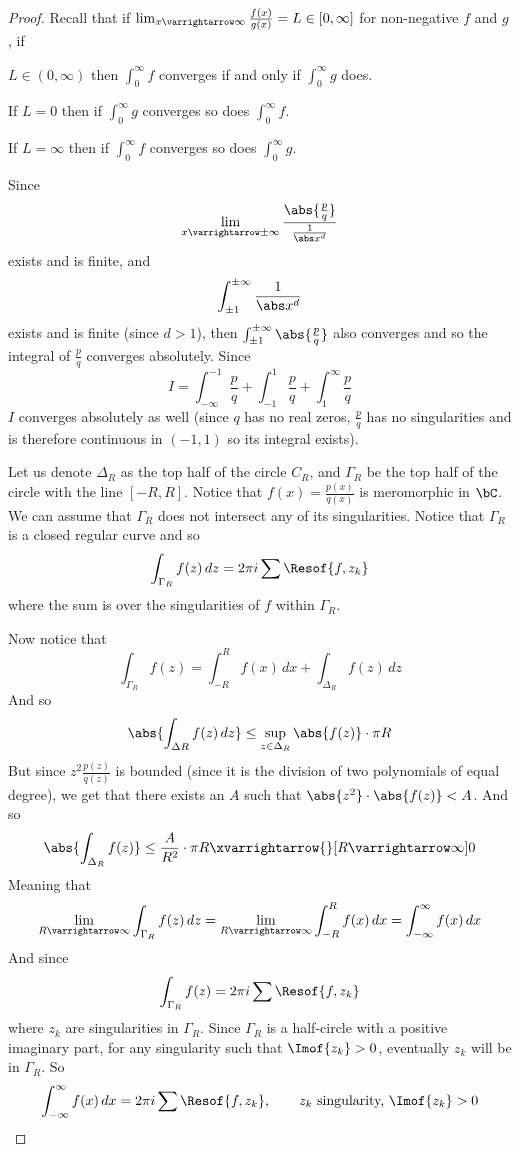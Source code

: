 \documentclass[10pt]{article}
\let\to=\varrightarrow
\begin{document}
\begin{proof}

    Recall that if $\lim_{x\to\infty}\frac{f(x)}{g(x)}=L\in[0,\infty]$ for non-negative $f$ and $g$, if
    \benum
        \item $L\in(0,\infty)$ then $\int_0^\infty f$ converges if and only if $\int_0^\infty g$ does.
        \item If $L=0$ then if $\int_0^\infty g$ converges so does $\int_0^\infty f$.
        \item If $L=\infty$ then if $\int_0^\infty f$ converges so does $\int_0^\infty g$.
    \eenum

    Since
    \[ \lim_{x\to\pm\infty}\frac{\abs{\frac pq}}{\frac1{\abs x^d}} \]
    exists and is finite, and
    \[ \int_{\pm1}^{\pm\infty}\frac1{\abs x^d} \]
    exists and is finite (since $d>1$), then $\int_{\pm1}^{\pm\infty}\abs{\frac pq}$ also converges and so the integral of $\frac pq$ converges absolutely.
    Since
    \[ I = \int_{-\infty}^{-1} \frac pq + \int_{-1}^1 \frac pq + \int_1^\infty \frac pq \]
    $I$ converges absolutely as well (since $q$ has no real zeros, $\frac pq$ has no singularities and is therefore continuous in $(-1,1)$ so its integral exists).

    Let us denote $\Delta_R$ as the top half of the circle $C_R$, and $\Gamma_R$ be the top half of the circle with the line $[-R,R]$.
    Notice that $f(x)=\frac{p(x)}{q(x)}$ is meromorphic in $\bC$.
    We can assume that $\Gamma_R$ does not intersect any of its singularities.
    Notice that $\Gamma_R$ is a closed regular curve and so
    \[ \int_{\Gamma_R} f(z)\,dz = 2\pi i\sum \Resof{f,z_k} \]
    where the sum is over the singularities of $f$ within $\Gamma_R$.

    Now notice that
    \[ \int_{\Gamma_R} f(z) = \int_{-R}^R f(x)\,dx + \int_{\Delta_R}f(z)\,dz \]
    And so
    \[ \abs{\int_{\Delta R}f(z)\,dz} \leq \sup_{z\in\Delta_R}\abs{f(z)}\cdot\pi R \]
    But since $z^2\frac{p(z)}{q(z)}$ is bounded (since it is the division of two polynomials of equal degree), we get that there exists an $A$ such that $\abs{z^2}\cdot\abs{f(z)}<A$.
    And so
    \[ \abs{\int_{\Delta_R}f(z)} \leq \frac A{R^2}\cdot\pi R\xvarrightarrow{}[R\to\infty] 0 \]
    Meaning that
    \[ \lim_{R\to\infty}\int_{\Gamma_R}f(z)\,dz = \lim_{R\to\infty}\int_{-R}^Rf(x)\,dx = \int_{-\infty}^\infty f(x)\,dx \]
    And since
    \[ \int_{\Gamma_R}f(z) = 2\pi i\sum\Resof{f,z_k} \]
    where $z_k$ are singularities in $\Gamma_R$.
    Since $\Gamma_R$ is a half-circle with a positive imaginary part, for any singularity such that $\Imof{z_k}>0$, eventually $z_k$ will be in $\Gamma_R$.
    So
    \[ \int_{-\infty}^\infty f(x)\,dx = 2\pi i\sum\Resof{f,z_k},\qquad z_k\text{ singularity, }\Imof{z_k}>0 \]

\end{proof}
\end{document}
